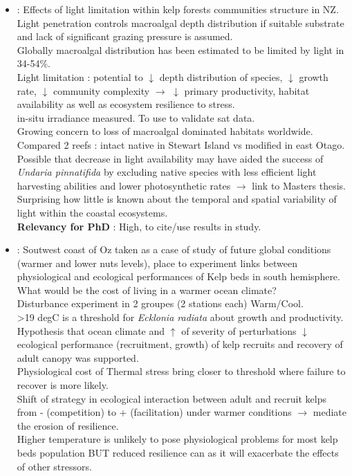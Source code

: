 \documentclass[]{report}
\begin{document}
\begin{itemize}
		\item \cite{desmond2015light} : Effects of light limitation within kelp forests communities structure in NZ.
		\\ Light penetration controls macroalgal depth distribution if suitable substrate and lack of significant grazing pressure is assumed.
		\\Globally macroalgal distribution has been estimated to be limited by light in 34-54\%.
		\\Light limitation : potential to $\downarrow$ depth distribution of species, $\downarrow$ growth rate, $\downarrow$ community complexity $\rightarrow$ $\downarrow$ primary productivity, habitat availability as well as ecosystem resilience to stress.
		\\in-situ irradiance measured. To use to validate sat data.
		\\Growing concern to loss of macroalgal dominated habitats worldwide.
		\\Compared 2 reefs : intact native in Stewart Island vs modified in east Otago.
		\\Possible that decrease in light availability may have aided the success of \textit{Undaria pinnatifida} by excluding native species with less efficient light harvesting abilities and lower photosynthetic rates $\rightarrow$ link to Masters thesis.
		\\Surprising how little is known about the temporal and spatial variability of light within the coastal ecosystems.
		\\\textbf{Relevancy for PhD} : High, to cite/use results in study.
		
		\item \cite{wernberg2010decreasing} :	Soutwest coast of Oz taken as a case of study of future global conditions (warmer and lower nuts levels), place to experiment links between physiological and ecological performances of Kelp beds in south hemisphere. What would be the cost of living in a warmer ocean climate?
		\\Disturbance experiment in 2 groupes (2 stations each) Warm/Cool.
		\\ >19 degC is a threshold for \textit{Ecklonia radiata} about growth and productivity. 
		\\ Hypothesis that ocean climate and $\uparrow$ of severity of perturbations $\downarrow$ ecological performance (recruitment, growth) of kelp recruits and recovery of adult canopy was supported.
		\\Physiological cost of Thermal stress bring closer to threshold where failure to recover is more likely.
		\\Shift of strategy in ecological interaction between adult and recruit kelps from - (competition) to + (facilitation) under warmer conditions $\rightarrow$ mediate the erosion of resilience.
		\\Higher temperature is unlikely to pose physiological problems for most kelp beds population BUT reduced resilience can as it will exacerbate the effects of other stressors.
		

\end{itemize}
\end{document}

